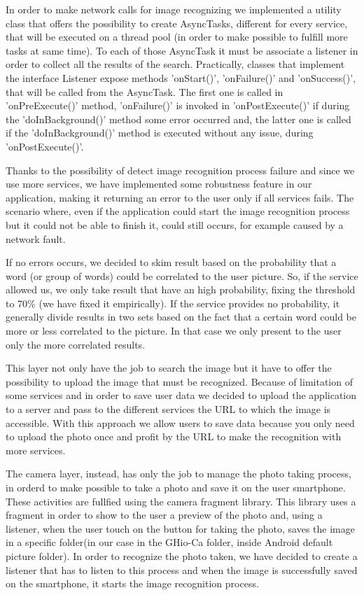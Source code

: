 In order to make network calls for image recognizing we implemented a utility 
class that offers the possibility to create AsyncTasks, different for every 
service, that will be executed on a thread pool (in order to make possible to 
fulfill more tasks at same time). To each of those AsyncTask it must be associate 
a listener in order to collect all the results of the search. Practically, 
classes that implement the interface Listener expose methods 'onStart()', 
'onFailure()' and 'onSuccess()', that will be called from the AsyncTask. The 
first one is called in 'onPreExecute()' method, 'onFailure()' is invoked in 
'onPostExecute()' if during the 'doInBackground()' method some error occurred 
and, the latter one is called if the 'doInBackground()' method is executed 
without any issue, during 'onPostExecute()'.

Thanks to the possibility of detect image recognition process failure and since 
we use more services, we have implemented some robustness feature in our 
application, making it returning an error to the user only if all services fails. 
The scenario where, even if the application could start the image recognition 
process but it could not be able to finish it, could still occurs, for example 
caused by a network fault.

If no errors occurs, we decided to skim result based on the probability that a 
word (or group of words) could be correlated to the user picture. So, if the 
service allowed us, we only take result that have an high probability, fixing the 
threshold to 70\% (we have fixed it empirically). If the service provides no 
probability, it generally divide results in two sets based on the fact that a 
certain word could be more or less correlated to the picture. In that case we 
only present to the user only the more correlated results.

This layer not only have the job to search the image but it have to offer the 
possibility to upload the image that must be recognized. Because of limitation 
of some services and in order to save user data we decided to upload the 
application to a server and pass to the different services the URL to which the 
image is accessible. With this approach we allow users to save data because you 
only need to upload the photo once and profit by the URL to make the recognition 
with more services.

The camera layer, instead, has only the job to manage the photo taking process, in 
orderd to make possible to take a photo and save it on the user smartphone. These
activities are fullfied using the camera fragment library. This library uses a 
fragment in order to show to the user a preview of the photo and, using a 
listener, when the user touch on the button for taking the photo, saves the 
image in a specific folder(in our case in the GHio-Ca folder, inside Android 
default picture folder). In order to recognize the photo taken, we have decided 
to create a listener that has to listen to this process and when the image is 
successfully saved on the smartphone, it starts the image recognition process. 

